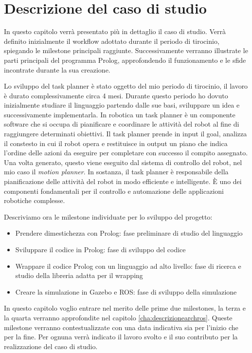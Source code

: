 \chapter{Descrizione del caso di studio}
\label{cha:descrizionecasostudio}
In questo capitolo verrà presentato più in dettaglio il caso di studio. Verrà definito inizialmente il workflow adottato durante il periodo di tirocinio, spiegando le milestone principali raggiunte.
Successivamente verranno illustrate le parti principali del programma Prolog, approfondendo il funzionamento e le sfide incontrate durante la sua creazione.

Lo sviluppo del task planner è stato oggetto del mio periodo di tirocinio, il lavoro è durato complessivamente circa 4 mesi. Durante questo periodo ho dovuto inizialmente studiare il linguaggio partendo dalle sue basi, sviluppare un idea e successivamente implementarla.
In robotica un task planner è un componente software che si occupa di pianificare e coordinare le attività del robot al fine di raggiungere determinati obiettivi.
Il task planner prende in input il goal, analizza il constesto in cui il robot opera e restituisce in output un piano che indica l'ordine delle azioni da eseguire per completare con successo il compito assegnato.
Una volta generato, questo viene eseguito dal sistema di controllo del robot, nel mio caso il \textit{motion planner}. In sostanza, il task planner è responsabile della pianificazione delle attività del robot in modo efficiente e intelligente. È uno dei componenti fondamentali per il controllo e automazione delle applicazioni robotiche complesse.

Descriviamo ora le milestone individuate per lo sviluppo del progetto:
\begin{itemize}
    \item Prendere dimestichezza con Prolog: fase preliminare di studio del linguaggio
    \item Sviluppare il codice in Prolog: fase di sviluppo del codice
    \item Wrappare il codice Prolog con un linguaggio ad alto livello: fase di ricerca e studio della libreria adatta per il wrapping
    \item Creare la simulazione in Gazebo e ROS: fase di sviluppo della simulazione
\end{itemize}
In questo capitolo voglio entrare nel merito delle prime due milestones, la terza e la quarta verranno approfondite nel capitolo \ref{cha:descrizionearchros}.
Queste milestone verranno contestualizzate con una data indicativa sia per l'inizio che per la fine. Per ognuna verrà indicato il lavoro svolto e il suo contributo per la realizzazione del caso di studio.

